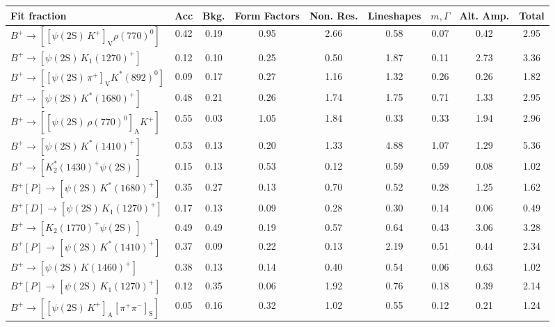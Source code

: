 \begin{tabular}{l  c  c  c  c  c  c  c  | c }
\hline
\hline
Fit fraction & Acc & Bkg. & Form Factors & Non. Res. & Lineshapes & $m,\Gamma$ & Alt. Amp. &  Total  \\ 
\hline
$B^{+}\rightarrow \left[\left[\psi(\text{2S})\,K^{+}\right]_{\text{V}}\rho(770)^{0}\right]$ & 0.42 & 0.19 & 0.95 & 2.66 & 0.58 & 0.07 & 0.42 & 2.95 \\ 
$B^{+}\rightarrow \left[\psi(\text{2S})\,K_{1}(1270)^{+}\right]$ & 0.12 & 0.10 & 0.25 & 0.50 & 1.87 & 0.11 & 2.73 & 3.36 \\ 
$B^{+}\rightarrow \left[\left[\psi(\text{2S})\,\pi^{+}\right]_{\text{V}}K^{*}(892)^{0}\right]$ & 0.09 & 0.17 & 0.27 & 1.16 & 1.32 & 0.26 & 0.26 & 1.82 \\ 
$B^{+}\rightarrow \left[\psi(\text{2S})\,K^{*}(1680)^{+}\right]$ & 0.48 & 0.21 & 0.26 & 1.74 & 1.75 & 0.71 & 1.33 & 2.95 \\ 
$B^{+}\rightarrow \left[\left[\psi(\text{2S})\,\rho(770)^{0}\right]_{\text{A}}K^{+}\right]$ & 0.55 & 0.03 & 1.05 & 1.84 & 0.33 & 0.33 & 1.94 & 2.96 \\ 
$B^{+}\rightarrow \left[\psi(\text{2S})\,K^{*}(1410)^{+}\right]$ & 0.53 & 0.13 & 0.20 & 1.33 & 4.88 & 1.07 & 1.29 & 5.36 \\ 
$B^{+}\rightarrow \left[K_{2}^{*}(1430)^{+}\psi(\text{2S})\,\right]$ & 0.15 & 0.13 & 0.53 & 0.12 & 0.59 & 0.59 & 0.08 & 1.02 \\ 
$B^{+}\left[P\right]\rightarrow \left[\psi(\text{2S})\,K^{*}(1680)^{+}\right]$ & 0.35 & 0.27 & 0.13 & 0.70 & 0.52 & 0.28 & 1.25 & 1.62 \\ 
$B^{+}\left[D\right]\rightarrow \left[\psi(\text{2S})\,K_{1}(1270)^{+}\right]$ & 0.17 & 0.13 & 0.09 & 0.28 & 0.30 & 0.14 & 0.06 & 0.49 \\ 
$B^{+}\rightarrow \left[K_{2}(1770)^{+}\psi(\text{2S})\,\right]$ & 0.49 & 0.49 & 0.19 & 0.57 & 0.64 & 0.43 & 3.06 & 3.28 \\ 
$B^{+}\left[P\right]\rightarrow \left[\psi(\text{2S})\,K^{*}(1410)^{+}\right]$ & 0.37 & 0.09 & 0.22 & 0.13 & 2.19 & 0.51 & 0.44 & 2.34 \\ 
$B^{+}\rightarrow \left[\psi(\text{2S})\,K(1460)^{+}\right]$ & 0.38 & 0.13 & 0.14 & 0.40 & 0.54 & 0.06 & 0.63 & 1.02 \\ 
$B^{+}\left[P\right]\rightarrow \left[\psi(\text{2S})\,K_{1}(1270)^{+}\right]$ & 0.12 & 0.35 & 0.06 & 1.92 & 0.76 & 0.18 & 0.39 & 2.14 \\ 
$B^{+}\rightarrow \left[\left[\psi(\text{2S})\,K^{+}\right]_{\text{A}}\left[\pi^{+}\pi^{-}\right]_{\text{S}}\right]$ & 0.05 & 0.16 & 0.32 & 1.02 & 0.55 & 0.12 & 0.21 & 1.24 \\ 

\end{tabular}
